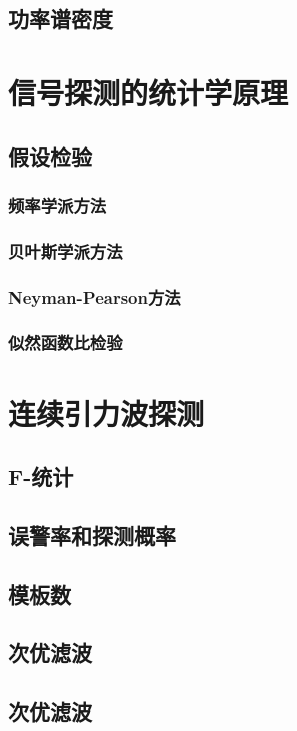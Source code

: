 \subsection{功率谱密度}

\section{信号探测的统计学原理}
\subsection{假设检验}
\subsubsection{频率学派方法}
\subsubsection{贝叶斯学派方法}
\subsubsection{Neyman-Pearson方法}
\subsubsection{似然函数比检验}

\section{连续引力波探测}
\subsection{F-统计}
\subsection{误警率和探测概率}
\subsection{模板数}
\subsection{次优滤波}
\subsection{次优滤波}


